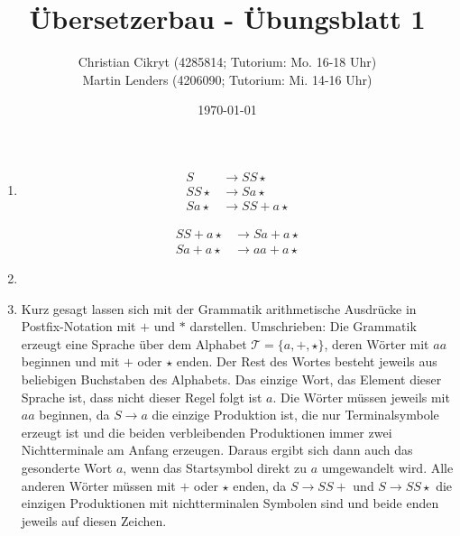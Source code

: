 \documentclass[a4paper,10pt]{scrartcl}
\title{Übersetzerbau - Übungsblatt 1}
\author{Christian Cikryt (4285814; Tutorium: Mo. 16-18 Uhr)\\Martin Lenders (4206090; Tutorium: Mi. 14-16 Uhr)}
\date{\today}
\begin{document}
\maketitle

\section{}
\begin{enumerate}
 \item	\begin{minipage}[t]{0.4\textwidth}
	  \begin{align*}
	    S & \to SS\star \tag{$S \to SS\star$} \\
	    SS\star & \to Sa\star \tag{$S \to a$} \\
	    Sa\star & \to SS+a\star \tag{$S \to SS+$}
	  \end{align*}
	\end{minipage}
	\begin{minipage}[t]{0.4\textwidth}
	  \begin{align*}
	    SS+a\star & \to Sa+a\star \tag{$S \to a$} \\
	    Sa+a\star & \to aa+a\star \tag{$S \to a$}
	  \end{align*}
	\end{minipage}
 \item	\begin{minipage}[t]{0.8\textwidth}
	  \centering
	\end{minipage}
 \item	Kurz gesagt lassen sich mit der Grammatik arithmetische Ausdrücke in Postfix-Notation mit $+$ und $*$ darstellen.
	Umschrieben: Die Grammatik erzeugt eine Sprache über dem Alphabet $\mathcal{T} = \{a,
	+, \star\}$, deren Wörter mit $aa$ beginnen und mit $+$ oder $\star$
  enden.
	Der Rest des Wortes besteht jeweils aus beliebigen Buchstaben des
  Alphabets.
	Das einzige Wort, das Element dieser Sprache ist, dass nicht dieser
Regel folgt ist $a$.
	Die Wörter müssen jeweils mit $aa$ beginnen, da $S \to a$ die einzige
	Produktion ist, die nur Terminalsymbole erzeugt ist und die beiden
	verbleibenden Produktionen immer zwei Nichtterminale am Anfang erzeugen.
	Daraus ergibt sich dann auch das gesonderte Wort $a$, wenn das
Startsymbol direkt zu $a$ umgewandelt wird. 
	Alle anderen Wörter müssen mit $+$ oder $\star$ enden, da $S \to SS+$
und $S \to SS\star$ die einzigen Produktionen mit nichtterminalen Symbolen sind
 und beide enden jeweils auf diesen Zeichen.
\end{enumerate}
\end{document}
